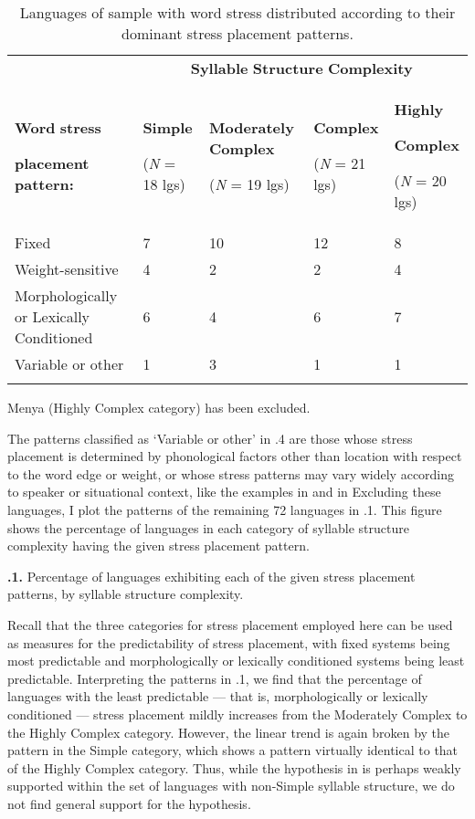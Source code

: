\begin{table}
\begin{tabularx}{\textwidth}{XXXXX}
\lsptoprule
 & \multicolumn{4}{c}{ \textbf{Syllable} \textbf{Structure} \textbf{Complexity}}\\
{ \textbf{Word} \textbf{stress} }

 \textbf{placement} \textbf{pattern:} & { \textbf{Simple}}

 (\textit{N} = 18 lgs) & { \textbf{Moderately} \textbf{Complex}}

 (\textit{N} = 19 lgs) & { \textbf{Complex}}

 (\textit{N} = 21 lgs) & { \textbf{Highly} }

{ \textbf{Complex}}

 (\textit{N} = 20 lgs)\\
 Fixed & 7 & 10 & 12 & 8\\
 Weight-sensitive & 4 & 2 & 2 & 4\\
 Morphologically or Lexically Conditioned & 6 & 4 & 6 & 7\\
 Variable or other & 1 & 3 & 1 & 1\\
\lspbottomrule
\end{tabularx}
\caption{\label{5.4}Languages of sample with word stress distributed according to their dominant stress placement patterns.}Menya (Highly Complex category) has been excluded.
\end{table}

  The patterns classified as ‘Variable or other’ in .4 are those whose stress placement is determined by phonological factors other than location with respect to the word edge or weight, or whose stress patterns may vary widely according to speaker or situational context, like the examples in  and  in  Excluding these languages, I plot the patterns of the remaining 72 languages in .1. This figure shows the percentage of languages in each category of syllable structure complexity having the given stress placement pattern.

\textbf{.1.} Percentage of languages exhibiting each of the given stress placement patterns, by syllable structure complexity.

  Recall that the three categories for stress placement employed here can be used as measures for the predictability of stress placement, with fixed systems being most predictable and morphologically or lexically conditioned systems being least predictable. Interpreting the patterns in .1, we find that the percentage of languages with the least predictable — that is, morphologically or lexically conditioned — stress placement mildly increases from the Moderately Complex to the Highly Complex category. However, the linear trend is again broken by the pattern in the Simple category, which shows a pattern virtually identical to that of the Highly Complex category. Thus, while the hypothesis in  is perhaps weakly supported within the set of languages with non-Simple syllable structure, we do not find general support for the hypothesis.

